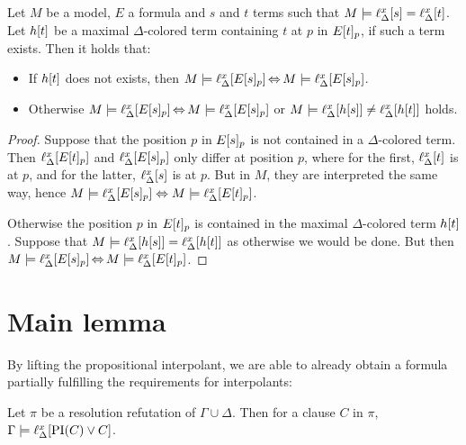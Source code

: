 \begin{lemma}
	\label{aga5tg5ba}
	Let $M$ be a model, $E$ a formula and $s$ and $t$ terms such that
	$M \models \ell_{\Delta}^{x}[s] = \ell_{\Delta}^{x}[t]$.
	Let $h[t]$ be a maximal $\Delta$-colored term containing $t$ at $p$ in $E{[t]_{p}}$, if such a term exists. Then it holds that:
\begin{itemize}
\item If $h[t]$ does not exists, then
	$M\models \ell_{\Delta}^{x}[E{[s]_{p}}] \operatorname{\Leftrightarrow} M \models \ell_{\Delta}^{x}[E{[s]_{p}}]$.
\item Otherwise
	$M\models \ell_{\Delta}^{x}[E{[s]_{p}}] \operatorname{\Leftrightarrow} M \models \ell_{\Delta}^{x}[E{[s]_{p}}]$
	or $M\models \ell_{\Delta}^{x}[h[s]] \neq \ell_{\Delta}^{x}[h[t]]$ holds.
\end{itemize}
\end{lemma}
\begin{proof} 
	Suppose that the position $p$ in $E{[s]_{p}}$ is not contained in a $\Delta$-colored term.
	Then $\ell_{\Delta}^{x}[E{[t]_{p}}]$ and $\ell_{\Delta}^{x}[E{[s]_{p}}]$ only differ at position $p$,
	where for the first, $\ell_{\Delta}^{x}[t]$ is at $p$, and for the latter, $\ell_{\Delta}^{x}[s]$ is at $p$.
	But in $M$, they are interpreted the same way, hence $M\entails\nolinebreak \lifdelta{E\occurat{s}{p}} \spas\semiff M \entails \lifdelta{E\occurat{t}{p}}$.

	Otherwise the position $p$ in $E{[t]_{p}}$ is contained in the maximal $\Delta$-colored term $h[t]$.
	Suppose that $M\models \ell_{\Delta}^{x}[h[s]]  = \ell_{\Delta}^{x}[h[t]]$ as otherwise we would be done.
	But then $M \entails\nolinebreak \lifdelta{E\occurat{s}{p}} \semiff{} M\entails \lifdelta{E\occurat{t}{p}}$.
\end{proof} 



\section{Main lemma}


By lifting the propositional interpolant, we are able to already obtain a formula partially fulfilling the requirements for interpolants:



\begin{lemma}
	Let $\pi$ be a resolution refutation of $\Gamma \cup \Delta$.
	Then for a clause $C$ in $\pi$,
	$ \Gamma \entails \lifdelta{\PI(C) \lor\nolinebreak C} $.
	\label{lemma:gamma_entails_interpolant}
\end{lemma}

